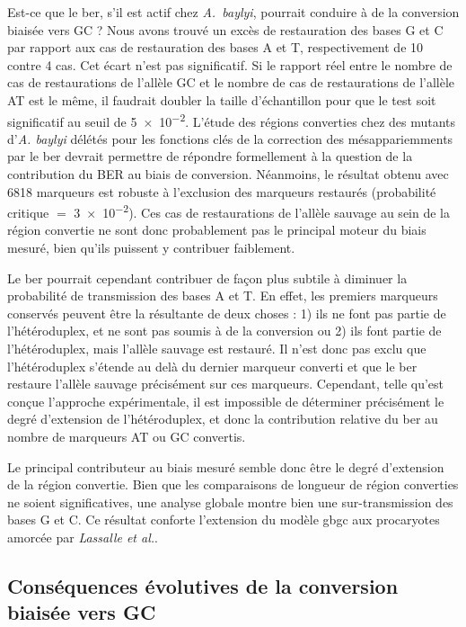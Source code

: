 Est-ce que le \ac{ber}, s'il est actif chez \emph{A.~baylyi}, pourrait
conduire à de la conversion biaisée vers GC ? Nous avons trouvé un excès de
restauration des bases G et C par rapport aux cas de restauration des bases A et
T, respectivement de 10 contre 4 cas. Cet écart n'est pas significatif. Si le
rapport réel entre le nombre de cas de restaurations de l'allèle GC et le nombre
de cas de restaurations de l'allèle AT est le même, il faudrait doubler la
taille d'échantillon pour que le test soit significatif au seuil de \num{5e-2}.
L'étude des régions converties chez des mutants d'\emph{A. baylyi} délétés pour
les fonctions clés de la correction des mésappariemments par le \ac{ber} devrait
permettre de répondre formellement à la question de la contribution du BER au
biais de conversion. Néanmoins, le résultat obtenu avec \num{6818} marqueurs est
robuste à l'exclusion des marqueurs restaurés (probabilité critique \(=\)
\num{3e-2}). Ces cas de restaurations de l'allèle sauvage au sein de la région
convertie ne sont donc probablement pas le principal moteur du biais mesuré,
bien qu'ils puissent y contribuer faiblement.

Le \ac{ber} pourrait cependant contribuer de façon plus subtile à diminuer la
probabilité de transmission des bases A et T. En effet, les premiers marqueurs
conservés peuvent être la résultante de deux choses : 1) ils ne font pas partie
de l'hétéroduplex, et ne sont pas soumis à de la conversion ou 2) ils font
partie de l'hétéroduplex, mais l'allèle sauvage est restauré. Il n'est donc pas
exclu que l'hétéroduplex s'étende au delà du dernier marqueur converti et que le
\ac{ber} restaure l'allèle sauvage précisément sur ces marqueurs. Cependant,
telle qu'est conçue l'approche expérimentale, il est impossible de déterminer
précisément le degré d'extension de l'hétéroduplex, et donc la contribution
relative du \ac{ber} au nombre de marqueurs AT ou GC convertis.

Le principal contributeur au biais mesuré semble donc être le degré d'extension
de la région convertie. Bien que les comparaisons de longueur de région
converties ne soient significatives, une analyse globale montre bien une
sur-transmission des bases G et C. Ce résultat conforte l'extension du modèle
\ac{gbgc} aux procaryotes amorcée par \textit{Lassalle et
  al.}\cite{lassalle_gc-content_2015}.

\subsection{Conséquences évolutives de la conversion biaisée vers GC}
\label{subsec:discu-conséquences}

